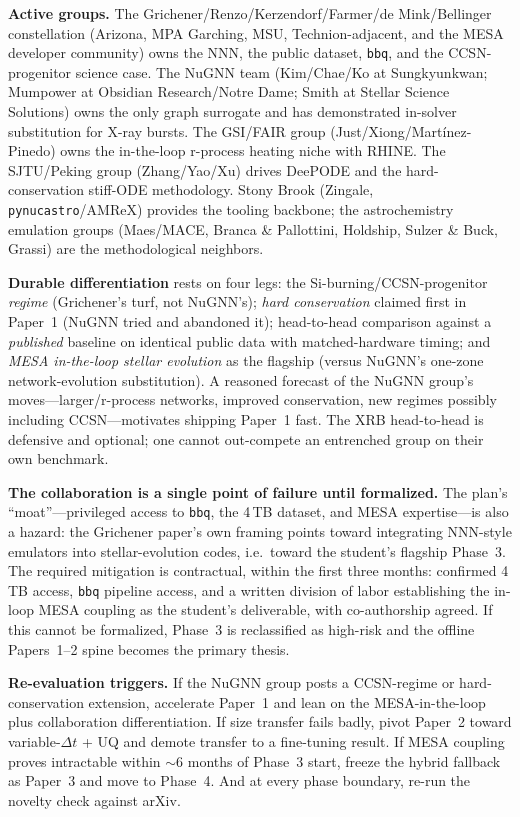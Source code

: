 \documentclass[11pt,a4paper]{article}
\newcommand{\code}[1]{\texttt{#1}}
\begin{document}
\textbf{Active groups.} The Grichener/Renzo/Kerzendorf/Farmer/de Mink/Bellinger constellation (Arizona, MPA Garching, MSU, Technion-adjacent, and the MESA developer community) owns the NNN, the public dataset, \code{bbq}, and the CCSN-progenitor science case. The NuGNN team (Kim/Chae/Ko at Sungkyunkwan; Mumpower at Obsidian Research/Notre Dame; Smith at Stellar Science Solutions) owns the only graph surrogate and has demonstrated in-solver substitution for X-ray bursts. The GSI/FAIR group (Just/Xiong/Mart\'inez-Pinedo) owns the in-the-loop r-process heating niche with RHINE. The SJTU/Peking group (Zhang/Yao/Xu) drives DeePODE and the hard-conservation stiff-ODE methodology. Stony Brook (Zingale, \code{pynucastro}/AMReX) provides the tooling backbone; the astrochemistry emulation groups (Maes/MACE, Branca \& Pallottini, Holdship, Sulzer \& Buck, Grassi) are the methodological neighbors.

\textbf{Durable differentiation} rests on four legs: the Si-burning/CCSN-progenitor \emph{regime} (Grichener's turf, not NuGNN's); \emph{hard conservation} claimed first in Paper~1 (NuGNN tried and abandoned it); head-to-head comparison against a \emph{published} baseline on identical public data with matched-hardware timing; and \emph{MESA in-the-loop stellar evolution} as the flagship (versus NuGNN's one-zone network-evolution substitution). A reasoned forecast of the NuGNN group's moves---larger/r-process networks, improved conservation, new regimes possibly including CCSN---motivates shipping Paper~1 fast. The XRB head-to-head is defensive and optional; one cannot out-compete an entrenched group on their own benchmark.

\textbf{The collaboration is a single point of failure until formalized.} The plan's ``moat''---privileged access to \code{bbq}, the 4\,TB dataset, and MESA expertise---is also a hazard: the Grichener paper's own framing points toward integrating NNN-style emulators into stellar-evolution codes, i.e.\ toward the student's flagship Phase~3. The required mitigation is contractual, within the first three months: confirmed 4\,TB access, \code{bbq} pipeline access, and a written division of labor establishing the in-loop MESA coupling as the student's deliverable, with co-authorship agreed. If this cannot be formalized, Phase~3 is reclassified as high-risk and the offline Papers~1--2 spine becomes the primary thesis.

\textbf{Re-evaluation triggers.} If the NuGNN group posts a CCSN-regime or hard-conservation extension, accelerate Paper~1 and lean on the MESA-in-the-loop plus collaboration differentiation. If size transfer fails badly, pivot Paper~2 toward variable-$\Delta t$ + UQ and demote transfer to a fine-tuning result. If MESA coupling proves intractable within ${\sim}6$ months of Phase~3 start, freeze the hybrid fallback as Paper~3 and move to Phase~4. And at every phase boundary, re-run the novelty check against arXiv.
\end{document}
